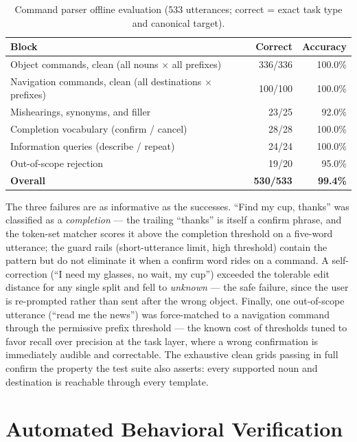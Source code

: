 \begin{table}[!htbp]
\centering
\caption[Command parser offline evaluation]{Command parser offline evaluation
(533 utterances; correct = exact task type and canonical target).}
\label{tab:parser_eval}
\small
\begin{tabular}{p{7.6cm} r r}
\toprule
\textbf{Block} & \textbf{Correct} & \textbf{Accuracy} \\
\midrule
Object commands, clean (all nouns $\times$ all prefixes) & 336/336 & 100.0\% \\
Navigation commands, clean (all destinations $\times$ prefixes) & 100/100 & 100.0\% \\
Mishearings, synonyms, and filler & 23/25 & 92.0\% \\
Completion vocabulary (confirm / cancel) & 28/28 & 100.0\% \\
Information queries (describe / repeat) & 24/24 & 100.0\% \\
Out-of-scope rejection & 19/20 & 95.0\% \\
\midrule
\textbf{Overall} & \textbf{530/533} & \textbf{99.4\%} \\
\bottomrule
\end{tabular}
\end{table}

The three failures are as informative as the successes. ``Find my cup, thanks''
was classified as a \emph{completion} --- the trailing ``thanks'' is itself a
confirm phrase, and the token-set matcher scores it above the completion
threshold on a five-word utterance; the guard rails (short-utterance limit, high
threshold) contain the pattern but do not eliminate it when a confirm word rides
on a command. A self-correction (``I need my glasses, no wait, my cup'') exceeded
the tolerable edit distance for any single split and fell to \emph{unknown} ---
the safe failure, since the user is re-prompted rather than sent after the wrong
object. Finally, one out-of-scope utterance (``read me the news'') was
force-matched to a navigation command through the permissive prefix threshold ---
the known cost of thresholds tuned to favor recall over precision at the task
layer, where a wrong confirmation is immediately audible and correctable. The
exhaustive clean grids passing in full confirm the property the test suite also
asserts: every supported noun and destination is reachable through every
template.

\section{Automated Behavioral Verification}
\label{sec:behavioral_eval}

